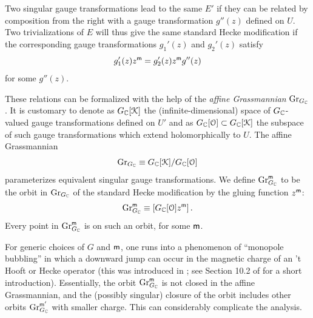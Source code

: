 \documentclass[11pt,a4paper]{article}
\begin{document}
Two singular gauge transformations lead to the same $E'$ if they can be related by composition from the right with a gauge transformation $g''(z)$ defined on $U$. Two trivializations of $E$ will thus give the 
same standard Hecke modification if the corresponding gauge transformations $g_1'(z)$ and $g_2'(z)$ satisfy 
\begin{equation}
g_1'(z)z^{\sf m} = g_2'(z)z^{\sf m} g''(z)
\end{equation}
for some $g''(z)$. 

These relations can be formalized with the help of the {\it affine Grassmannian} ${\mathrm{Gr}}_{G_{\mathbb C}}$. It is customary to denote as $G_{\mathbb C}[{\cal K}]$ the (infinite-dimensional) space of $G_{\mathbb C}$-valued  gauge transformations  defined on $U'$ and as $G_{\mathbb C}[{\cal O}]\subset G_{\mathbb C}[{\cal K}]$ the subspace of such gauge transformations which extend holomorphically to $U$. The affine Grassmannian 
\begin{equation}
{\mathrm{Gr}}_{G_{\mathbb C}} \equiv G_{\mathbb C}[{\cal K}]/G_{\mathbb C}[{\cal O}]
\end{equation}
parameterizes equivalent singular gauge transformations.  We define ${\mathrm{Gr}}^{\sf m}_{G_{\mathbb C}}$ to be the orbit in ${\mathrm{Gr}}_{G_{\mathbb C}}$ of the standard
Hecke modification by the gluing function $z^{\sf m}$:
\begin{equation}
{\mathrm{Gr}}^{\sf m}_{G_{\mathbb C}} \equiv \left[G_{\mathbb C}[{\cal O}] z^{\sf m} \right].
\end{equation}
Every point in ${\mathrm{Gr}}^{\sf m}_{G_{\mathbb C}}$ is on such an orbit, for some ${\sf m}$.


For generic choices of $G$ and ${\sf m}$, one runs into a phenomenon of ``monopole 
bubbling'' in which a downward jump can occur in the magnetic charge of an  't Hooft or Hecke operator
(this was introduced in \cite{Kron,Pauly}; see Section 10.2 of \cite{KW} for a short introduction).   
Essentially, the orbit ${\mathrm{Gr}}^{\sf m}_{G_{\mathbb C}}$ is not closed in the affine Grassmannian, and the (possibly singular) closure of the orbit
includes other orbits ${\mathrm{Gr}}^{{\sf m}'}_{G_{\mathbb C}}$ with smaller charge. This can considerably complicate the analysis.
\end{document}
